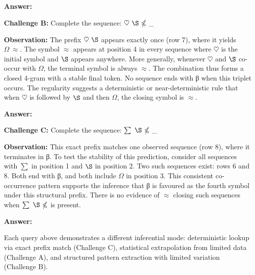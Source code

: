 {\noindent\textbf{Answer:} \boxed{\mathbb{\Omega}}

\vspace{1em}
\noindent\textbf{Challenge B:} Complete the sequence: $\heartsuit \ \S \ \mathbb{\Omega} \ \_$

\vspace{0.3em}
\noindent\textbf{Observation:} The prefix $\heartsuit \ \S$ appears exactly once (row 7), where it yields $\mathbb{\Omega} \ \approx$. The symbol $\approx$ appears at position 4 in every sequence where $\heartsuit$ is the initial symbol and $\S$ appears anywhere. More generally, whenever $\heartsuit$ and $\S$ co-occur with $\mathbb{\Omega}$, the terminal symbol is always $\approx$. The combination thus forms a closed 4-gram with a stable final token. No sequence ends with β when this triplet occurs. The regularity suggests a deterministic or near-deterministic rule that when $\heartsuit$ is followed by $\S$ and then $\mathbb{\Omega}$, the closing symbol is $\approx$.

\noindent\textbf{Answer:} \boxed{\approx}

\vspace{1em}
\noindent\textbf{Challenge C:} Complete the sequence: $\sum \ \S \ \mathbb{\Omega} \ \_$

\vspace{0.3em}
\noindent\textbf{Observation:} This exact prefix matches one observed sequence (row 8), where it terminates in β. To test the stability of this prediction, consider all sequences with $\sum$ in position 1 and $\S$ in position 2. Two such sequences exist: rows 6 and 8. Both end with β, and both include $\mathbb{\Omega}$ in position 3. This consistent co-occurrence pattern supports the inference that β is favoured as the fourth symbol under this structural prefix. There is no evidence of $\approx$ closing such sequences when $\sum \ \S \ \mathbb{\Omega}$ is present.

\noindent\textbf{Answer:} 

\vspace{1em}

Each query above demonstrates a different inferential mode: deterministic lookup via exact prefix match (Challenge C), statistical extrapolation from limited data (Challenge A), and structured pattern extraction with limited variation (Challenge B). 
}

